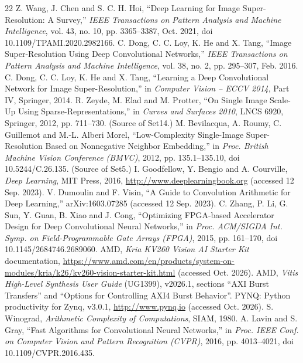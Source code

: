 
\begin{thebibliography}{22}
 Z. Wang, J. Chen and S. C. H. Hoi, ``Deep Learning for Image Super-Resolution: A Survey,'' \emph{IEEE Transactions on Pattern Analysis and Machine Intelligence}, vol. 43, no. 10, pp. 3365--3387, Oct. 2021, doi 10.1109/TPAMI.2020.2982166.
 C. Dong, C. C. Loy, K. He and X. Tang, ``Image Super-Resolution Using Deep Convolutional Networks,'' \emph{IEEE Transactions on Pattern Analysis and Machine Intelligence}, vol. 38, no. 2, pp. 295--307, Feb. 2016.
 C. Dong, C. C. Loy, K. He and X. Tang, ``Learning a Deep Convolutional Network for Image Super-Resolution,'' in \emph{Computer Vision -- ECCV 2014}, Part IV, Springer, 2014.
 R. Zeyde, M. Elad and M. Protter, ``On Single Image Scale-Up Using Sparse-Representations,'' in \emph{Curves and Surfaces 2010}, LNCS 6920, Springer, 2012, pp. 711--730. (Source of Set14.)
 M. Bevilacqua, A. Roumy, C. Guillemot and M.-L. Alberi Morel, ``Low-Complexity Single-Image Super-Resolution Based on Nonnegative Neighbor Embedding,'' in \emph{Proc. British Machine Vision Conference (BMVC)}, 2012, pp. 135.1--135.10, doi 10.5244/C.26.135. (Source of Set5.)
 I. Goodfellow, Y. Bengio and A. Courville, \emph{Deep Learning}, MIT Press, 2016, \url{http://www.deeplearningbook.org} (accessed 12 Sep. 2023).
 V. Dumoulin and F. Visin, ``A Guide to Convolution Arithmetic for Deep Learning,'' arXiv:1603.07285 (accessed 12 Sep. 2023).
 C. Zhang, P. Li, G. Sun, Y. Guan, B. Xiao and J. Cong, ``Optimizing FPGA-based Accelerator Design for Deep Convolutional Neural Networks,'' in \emph{Proc. ACM/SIGDA Int. Symp. on Field-Programmable Gate Arrays (FPGA)}, 2015, pp. 161--170, doi 10.1145/2684746.2689060.
 AMD, \emph{Kria KV260 Vision AI Starter Kit} documentation, \url{https://www.amd.com/en/products/system-on-modules/kria/k26/kv260-vision-starter-kit.html} (accessed Oct. 2026).
 AMD, \emph{Vitis High-Level Synthesis User Guide} (UG1399), v2026.1, sections ``AXI Burst Transfers'' and ``Options for Controlling AXI4 Burst Behavior''.
 PYNQ: Python productivity for Zynq, v3.0.1, \url{http://www.pynq.io} (accessed Oct. 2026).
 S. Winograd, \emph{Arithmetic Complexity of Computations}, SIAM, 1980.
 A. Lavin and S. Gray, ``Fast Algorithms for Convolutional Neural Networks,'' in \emph{Proc. IEEE Conf. on Computer Vision and Pattern Recognition (CVPR)}, 2016, pp. 4013--4021, doi 10.1109/CVPR.2016.435.

\end{thebibliography}
